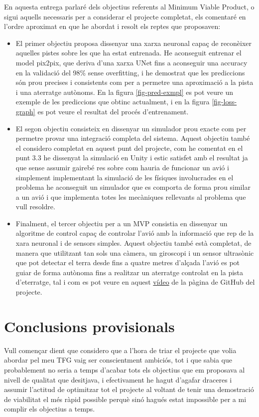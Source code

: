 \documentclass[10pt,a4paper,twocolumn,twoside]{article}
\begin{document}
En aquesta entrega parlaré dels objectius referents al Minimum Viable Product, o sigui aquells necessaris per a considerar el projecte 
completat, els comentaré en l'ordre aproximat en que he abordat i resolt els reptes que proposaven:
\begin{itemize}
        \item {El primer objectiu proposa dissenyar una xarxa neuronal capaç de reconèixer aquelles pistes sobre les que ha estat entrenada. He aconseguit entrenar el model pix2pix, que deriva d'una xarxa UNet fins a aconseguir una accuracy en la validació del 98\% sense overfitting, i he demostrat que les prediccions són prou precises i consistents com per a permetre una aproximació a la pista i una aterratge autònoms. En la figura \ref{fig-pred-exmpl} es pot veure un exemple de les prediccions que obtinc actualment, i en la figura \ref{fig-loss-graph} es pot veure el resultat del procés d'entrenament.}
        \item {El segon objectiu consisteix en dissenyar un simulador prou exacte com per permetre provar una integració completa del sistema. Aquest objectiu també el considero completat en aquest punt del projecte, com he comentat en el punt 3.3 he dissenyat la simulació en Unity i estic satisfet amb el resultat ja que sense assumir gairebé res sobre com hauria de funcionar un avió i simplement implementant la simulació de les físiques involucrades en el problema he aconseguit un simulador que es comporta de forma prou similar a un avió i que implementa totes les mecàniques rellevants al problema que vull resoldre.}
        \item {Finalment, el tercer objectiu per a un MVP consistia en dissenyar un algoritme de control capaç de controlar l'avió amb la informació que rep de la xara neuronal i de sensors simples. Aquest objectiu també està completat, de manera que utilitzant tan sols una càmera, un giroscopi i un sensor ultrasònic que pot detectar el terra desde fins a quatre metres d'alçada l'avió es pot guiar de forma autònoma fins a realitzar un aterratge controlat en la pista d'eterratge, tal i com es pot veure en aquest \href{https://github.com/NarcisNogue/Aterratge-automatic-d-avions-model-basat-en-visio#autor-narc%C3%ADs-nogu%C3%A9-bonet}{vídeo} de la pàgina de GitHub del projecte.}
\end{itemize}

\section{Conclusions provisionals}
Vull començar dient que considero que a l'hora de triar el projecte que volia abordar pel meu TFG vaig ser conscientment ambiciós, tot 
i que sabia que probablement no seria a temps d'acabar tots els objectius que em proposava al nivell de qualitat que desitjava, i efectivament 
he hagut d'agafar draceres i assumir l'actitud de optimitzar tot el projecte al voltant de tenir una demostració de viabilitat el més 
ràpid possible perquè sinó hagués estat impossible per a mi complir els objectius a temps.
\end{document}
